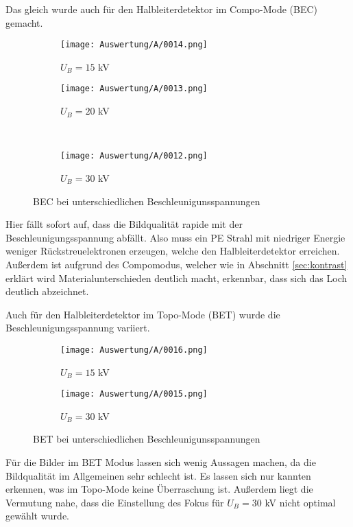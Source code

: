 \newpage
Das gleich wurde auch für den Halbleiterdetektor im Compo-Mode (BEC) gemacht.
\begin{figure}[h]
    \centering
    
    \begin{subfigure}[b]{0.45\textwidth}
        \centering
        \texttt{[image: Auswertung/A/0014.png]}
        \caption{$U_B = 15$ kV}
    \end{subfigure}
    \hfill
    \begin{subfigure}[b]{0.45\textwidth}
        \centering
        \texttt{[image: Auswertung/A/0013.png]}
        \caption{$U_B = 20$ kV}
    \end{subfigure}
    \\
    \begin{subfigure}[b]{0.45\textwidth}
        \centering
        \texttt{[image: Auswertung/A/0012.png]}
        \caption{$U_B = 30$ kV}
    \end{subfigure}
    \caption{BEC bei unterschiedlichen Beschleunigunsspannungen}
\end{figure}

Hier fällt sofort auf, dass die Bildqualität rapide mit der Beschleunigungsspannung abfällt. Also muss ein PE Strahl mit niedriger Energie weniger Rückstreuelektronen erzeugen, welche den Halbleiterdetektor erreichen. Außerdem ist aufgrund des Compomodus, welcher wie in Abschnitt \ref{sec:kontrast} erklärt wird Materialunterschieden deutlich macht, erkennbar, dass sich das Loch deutlich abzeichnet.

\newpage
Auch für den Halbleiterdetektor im Topo-Mode (BET) wurde die Beschleunigungsspannung variiert.
\begin{figure}[h]
    \centering
    
    \begin{subfigure}[b]{0.45\textwidth}
        \centering
        \texttt{[image: Auswertung/A/0016.png]}
        \caption{$U_B = 15$ kV}
    \end{subfigure}
    \hfill
    \begin{subfigure}[b]{0.45\textwidth}
        \centering
        \texttt{[image: Auswertung/A/0015.png]}
        \caption{$U_B = 30$ kV}
    \end{subfigure}
    
    \caption{BET bei unterschiedlichen Beschleunigunsspannungen}
\end{figure}

Für die Bilder im BET Modus lassen sich wenig Aussagen machen, da die Bildqualität im Allgemeinen sehr schlecht ist. Es lassen sich nur kannten erkennen, was im Topo-Mode keine Überraschung ist. Außerdem liegt die Vermutung nahe, dass die Einstellung des Fokus für $U_B = 30$ kV nicht optimal gewählt wurde.

